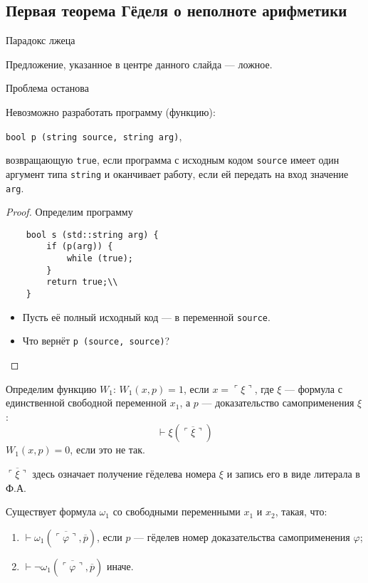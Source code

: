 \subsection{Первая теорема Гёделя о неполноте арифметики}


{Парадокс лжеца}
\begin{center}
    Предложение, указанное в центре данного слайда --- ложное.
\end{center}


{Проблема останова}
\begin{theorem}
    Невозможно разработать программу (функцию):
    \begin{center} \texttt{bool p (string source, string arg)},\end{center}
возвращающую \texttt{true}, если программа с исходным кодом \texttt{source} имеет один аргумент
типа \texttt{string} и оканчивает работу, если ей передать на вход значение \texttt{arg}.
\end{theorem}

\begin{proof}
Определим программу
\begin{verbatim}
    bool s (std::string arg) {
        if (p(arg)) {
            while (true);
        }
        return true;\\
    }
\end{verbatim}
\begin{itemize}
\item Пусть её полный исходный код --- в переменной \texttt{source}.
\item Что вернёт \texttt{p (source, source)}?
\end{itemize}
\end{proof}


\begin{definition}
    Определим функцию $W_1$:
$W_1(x,p)=1$, если
$x = \ulcorner \xi \urcorner$, где $\xi$ --- формула с единственной свободной переменной $x_1$, а $p$ --- доказательство самоприменения $\xi$:
$$\vdash \xi(\overline{\ulcorner \xi \urcorner})$$
$W_1(x,p)=0$, если это не так.
\end{definition}

\begin{note}
    $\overline{\ulcorner \xi \urcorner}$ здесь означает получение гёделева номера $\xi$ и запись его в виде литерала в Ф.А.
\end{note}

\begin{theorem}
    Существует формула $\omega_1$ со свободными переменными $x_1$ и $x_2$,
такая, что:
\begin{enumerate}
\item $\vdash \omega_1(\overline{\ulcorner \varphi \urcorner},\overline{p})$, если $p$ --- гёделев номер
доказательства самоприменения $\varphi$;
\item $\vdash \neg\omega_1(\overline{\ulcorner \varphi \urcorner},\overline{p})$ иначе.
\end{enumerate}
\end{theorem}

